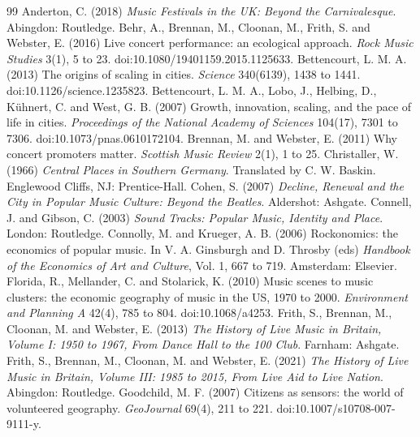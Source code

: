 \documentclass[11pt,a4paper]{article}
\begin{document}
\begin{thebibliography}{99}
 Anderton, C. (2018) \textit{Music Festivals in the UK: Beyond the Carnivalesque}. Abingdon: Routledge.
 Behr, A., Brennan, M., Cloonan, M., Frith, S. and Webster, E. (2016) Live concert performance: an ecological approach. \textit{Rock Music Studies} 3(1), 5 to 23. doi:10.1080/19401159.2015.1125633.
 Bettencourt, L. M. A. (2013) The origins of scaling in cities. \textit{Science} 340(6139), 1438 to 1441. doi:10.1126/science.1235823.
 Bettencourt, L. M. A., Lobo, J., Helbing, D., K\"uhnert, C. and West, G. B. (2007) Growth, innovation, scaling, and the pace of life in cities. \textit{Proceedings of the National Academy of Sciences} 104(17), 7301 to 7306. doi:10.1073/pnas.0610172104.
 Brennan, M. and Webster, E. (2011) Why concert promoters matter. \textit{Scottish Music Review} 2(1), 1 to 25.
 Christaller, W. (1966) \textit{Central Places in Southern Germany}. Translated by C. W. Baskin. Englewood Cliffs, NJ: Prentice-Hall.
 Cohen, S. (2007) \textit{Decline, Renewal and the City in Popular Music Culture: Beyond the Beatles}. Aldershot: Ashgate.
 Connell, J. and Gibson, C. (2003) \textit{Sound Tracks: Popular Music, Identity and Place}. London: Routledge.
 Connolly, M. and Krueger, A. B. (2006) Rockonomics: the economics of popular music. In V. A. Ginsburgh and D. Throsby (eds) \textit{Handbook of the Economics of Art and Culture}, Vol. 1, 667 to 719. Amsterdam: Elsevier.
 Florida, R., Mellander, C. and Stolarick, K. (2010) Music scenes to music clusters: the economic geography of music in the US, 1970 to 2000. \textit{Environment and Planning A} 42(4), 785 to 804. doi:10.1068/a4253.
 Frith, S., Brennan, M., Cloonan, M. and Webster, E. (2013) \textit{The History of Live Music in Britain, Volume I: 1950 to 1967, From Dance Hall to the 100 Club}. Farnham: Ashgate.
 Frith, S., Brennan, M., Cloonan, M. and Webster, E. (2021) \textit{The History of Live Music in Britain, Volume III: 1985 to 2015, From Live Aid to Live Nation}. Abingdon: Routledge.
 Goodchild, M. F. (2007) Citizens as sensors: the world of volunteered geography. \textit{GeoJournal} 69(4), 211 to 221. doi:10.1007/s10708-007-9111-y.

\end{thebibliography}
\end{document}
